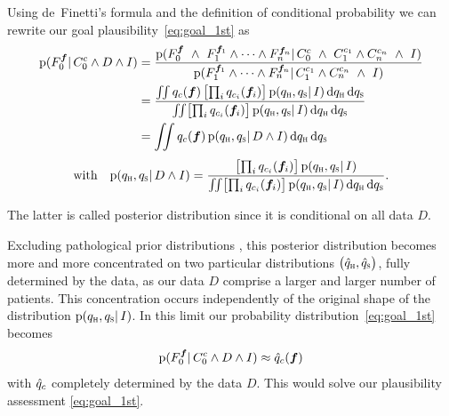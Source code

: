 \documentclass[%
]{frontiersSCNS-nologo} %
\newcommand*{\di}{\mathrm{d}}%
\newcommand*{\pf}{\mathrm{p}}%
\renewcommand*{\|}{\mathpunct{|}}%
\newcommand*{\Land}{\mathbin{\ \land\ }}
\let\oldprod\prod
\renewcommand*{\prod}{\mathop{\textstyle\oldprod}}
\newcommand*{\yH}{C}
\newcommand*{\yh}{c}
\newcommand*{\yhu}{\textsc{h}}
\newcommand*{\yhd}{\textsc{s}}
\newcommand*{\yD}{D}
\newcommand*{\yF}{F}
\newcommand*{\yf}{\bm{f}}
\newcommand*{\yp}{q}
\newcommand*{\yph}{q_{\yhu}}
\newcommand*{\yps}{q_{\yhd}}
\newcommand*{\ypc}{\Hat{\yp}}
\newcommand*{\yn}{n}
\newcommand*{\yI}{I}
\begin{document}
Using de~Finetti's formula and the definition of conditional probability we
can rewrite our goal plausibility~\eqref{eq:goal_1st} as
\begin{subequations}\label{eq:goal_1st_exchangeability}
  \begin{gather}
    \begin{aligned}[b]
    \pf( \yF_0^{\yf}\| \yH_0^{\yh} \land \yD \land \yI)
    &=
\frac{\pf( \yF_0^{\yf} \Land \yF_1^{\yf_1} \land \dotsb  \land \yF_{\yn}^{\yf_{\yn}}
\|\yH_0^{\yh} \Land \yH_1^{\yh_1}\land \yH_{\yn}^{\yh_{\yn}}
\Land \yI )}{
\pf(  \yF_1^{\yf_1}\land \dotsb  \land \yF_{\yn}^{\yf_{\yn}}
\| \yH_1^{\yh_1}\land \yH_{\yn}^{\yh_{\yn}}
\Land \yI )
}
\\
&= \frac{
  \iint \yp_{\yh}(\yf)\, \bigl[ \prod_i \yp_{\yh_i}(\yf_i) \bigr]\,
  \pf(\yph,\yps \|\yI) \,\di\yph\,\di\yps
}{
  \iint \bigl[ \prod_i \yp_{\yh_i}(\yf_i) \bigr]\,
  \pf(\yph,\yps \|\yI) \,\di\yph\,\di\yps
}
\\
&=    \iint \yp_{\yh}(\yf)\, \pf(\yph,\yps \|\yD \land \yI) \,\di\yph\,\di\yps
    \end{aligned}
    \\[\jot]
    \text{with} \quad
    \pf(\yph,\yps \|\yD \land \yI) 
    = \frac{\bigl[ \prod_i \yp_{\yh_i}(\yf_i) \bigr]\,
      \pf(\yph,\yps \|\yI)
    }{
      \iint \bigl[ \prod_i \yp_{\yh_i}(\yf_i) \bigr]\,
      \pf(\yph,\yps \|\yI) \,\di\yph\,\di\yps }    
      .
    \label{eq:updated_hyperprior_nonparametric}
  \end{gather}
\end{subequations}

The latter is called posterior distribution since it is conditional on all
data $\yD$.

Excluding pathological prior distributions \citep{diaconisetal1986}, this
posterior distribution becomes more and more concentrated on two particular
distributions $\bigl(\ypc_{\yhu}, \ypc_{\yhd}\bigr)$, fully determined by
the data, as our data $\yD$ comprise a larger and larger number of
patients. This concentration occurs independently of the original shape of
the distribution $\pf(\yph,\yps \|\yI)$. In this limit our probability
distribution~\eqref{eq:goal_1st} becomes
\begin{equation}
  \label{eq:goal_1st_limit}
  \pf( \yF_0^{\yf} \| \yH_0^{\yh} \land \yD \land \yI)
  \approx
  \ypc_{\yh}(\yf)
\end{equation}
with $\ypc_{\yh}$ completely determined by the data $\yD$. This would solve
our plausibility assessment \eqref{eq:goal_1st}.
\end{document}
